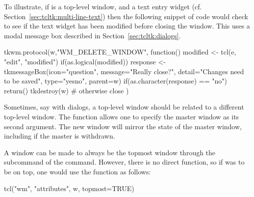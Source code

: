 To illustrate, if  is a top-level window, and
 a text entry widget
(cf. Section~\ref{sec:tcltk:multi-line-text}) then the following
snippet of code would check to see if the text widget has been
modified before closing the window. This uses a modal message box
described in Section~\ref{sec:tcltk:dialogs}.



\begin{Schunk}
\begin{Sinput}
 tkwm.protocol(w,"WM_DELETE_WINDOW", function() {
   modified <- tcl(e, "edit", "modified")
   if(as.logical(modified)) {
     response <- 
       tkmessageBox(icon="question",
                    message="Really close?",
                    detail="Changes need to be saved",
                    type="yesno",
                    parent=w)
     if(as.character(response) == "no")
       return()
   }
   tkdestroy(w)                          # otherwise close
 })
\end{Sinput}
\end{Schunk}

Sometimes, say with dialogs, a top-level window should be related to
a different top-level window. The function 
allows one to specify the master window as its second argument. The
new window will mirror the state of the master window, including if
the master is withdrawn.


A window can be made to always be the topmost window through the
 subcommand of the  command. However, there
is no direct  function, so if  was to be on top, one would use the 
function as follows: 
\begin{Schunk}
\begin{Sinput}
tcl("wm", "attributes", w, topmost=TRUE)  
\end{Sinput}
\end{Schunk}




